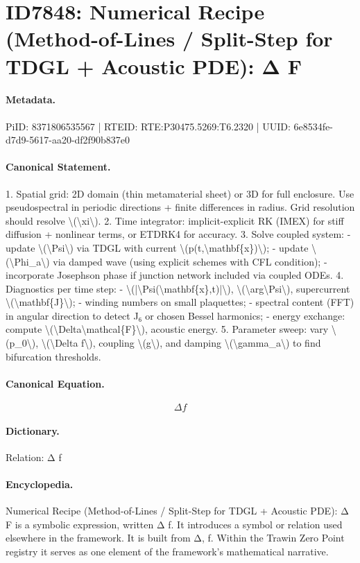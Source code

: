 \section*{ID7848: Numerical Recipe (Method-of-Lines / Split-Step for TDGL + Acoustic PDE): Δ F}
\paragraph{Metadata.}
PiID: 8371806535567 | RTEID: RTE:P30475.5269:T6.2320 | UUID: 6e8534fe-d7d9-5617-aa20-df2f90b837e0

\paragraph{Canonical Statement.}
1. Spatial grid: 2D domain (thin metamaterial sheet) or 3D for full enclosure. Use pseudospectral in periodic directions + finite differences in radius. Grid resolution should resolve \textbackslash{}(\textbackslash{}xi\textbackslash{}). 2. Time integrator: implicit-explicit RK (IMEX) for stiff diffusion + nonlinear terms, or ETDRK4 for accuracy. 3. Solve coupled system: - update \textbackslash{}(\textbackslash{}Psi\textbackslash{}) via TDGL with current \textbackslash{}(p(t,\textbackslash{}mathbf\{x\})\textbackslash{}); - update \textbackslash{}(\textbackslash{}Phi\_a\textbackslash{}) via damped wave (using explicit schemes with CFL condition); - incorporate Josephson phase if junction network included via coupled ODEs. 4. Diagnostics per time step: - \textbackslash{}(|\textbackslash{}Psi(\textbackslash{}mathbf\{x\},t)|\textbackslash{}), \textbackslash{}(\textbackslash{}arg\textbackslash{}Psi\textbackslash{}), supercurrent \textbackslash{}(\textbackslash{}mathbf\{J\}\textbackslash{}); - winding numbers on small plaquettes; - spectral content (FFT) in angular direction to detect J₆ or chosen Bessel harmonics; - energy exchange: compute \textbackslash{}(\textbackslash{}Delta\textbackslash{}mathcal\{F\}\textbackslash{}), acoustic energy. 5. Parameter sweep: vary \textbackslash{}(p\_0\textbackslash{}), \textbackslash{}(\textbackslash{}Delta f\textbackslash{}), coupling \textbackslash{}(g\textbackslash{}), and damping \textbackslash{}(\textbackslash{}gamma\_a\textbackslash{}) to find bifurcation thresholds.

\paragraph{Canonical Equation.}
\[
\Delta f
\]

\paragraph{Dictionary.}
Relation: Δ f

\paragraph{Encyclopedia.}
Numerical Recipe (Method-of-Lines / Split-Step for TDGL + Acoustic PDE): Δ F is a symbolic expression, written Δ f. It introduces a symbol or relation used elsewhere in the framework. It is built from Δ, f. Within the Trawin Zero Point registry it serves as one element of the framework's mathematical narrative.

